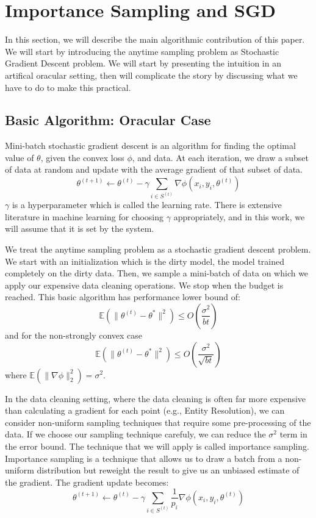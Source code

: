 \section{Importance Sampling and SGD}
In this section, we will describe the main algorithmic contribution of this paper.
We will start by introducing the anytime sampling problem as Stochastic Gradient Descent problem.
We will start by presenting the intuition in an artifical oracular setting, then will complicate the
story by discussing what we have to do to make this practical.

\subsection{Basic Algorithm: Oracular Case}
Mini-batch stochastic gradient descent is an algorithm for finding the optimal value
of $\theta$, given the convex loss $\phi$, and data.
At each iteration, we draw a subset of data at random and update with the average gradient of that subset of data.
 \[
 \theta^{(t+1)}\leftarrow\theta^{(t)}-\gamma\sum_{i\in S^{(t)}}\nabla\phi(x_{i},y_{i},\theta^{(t)})
 \]
$\gamma$ is a hyperparameter which is called the learning rate.
There is extensive literature in machine learning for choosing $\gamma$ appropriately, and in this work, we will assume that it is set by the system.

We treat the anytime sampling problem as a stochastic gradient descent problem.
We start with an initialization which is the dirty model, the model trained completely on the dirty data.
Then, we sample a mini-batch of data on which we apply our expensive data cleaning operations.
We stop when the budget is reached.
This basic algorithm has performance lower bound of:
\[
\mathbb{E}(\|\theta^{(t)}-\theta^{*}\|^{2})\le O(\frac{\sigma^{2}}{bt})
\]
and for the non-strongly convex case 
\[
\mathbb{E}(\|\theta^{(t)}-\theta^{*}\|^{2})\le O(\frac{\sigma^{2}}{\sqrt{bt}})
\]
where $\mathbb{E}(\|\nabla\phi\|_{2}^{2})=\sigma^{2}$.

In the data cleaning setting, where the data cleaning is often far more expensive than calculating a gradient for each point (e.g., Entity Resolution), we can consider non-uniform sampling techniques that require some pre-processing of the data.
If we choose our sampling technique carefuly, we can reduce the $\sigma^{2}$ term in the error bound.
The technique that we will apply is called importance sampling.
Importance sampling is a technique that allows us to draw a batch from a non-uniform distribution but reweight the result to give us an unbiased estimate of the gradient.
The gradient update becomes:
\[\theta^{(t+1)}\leftarrow\theta^{(t)}-\gamma\sum_{i\in S^{(t)}}\frac{1}{p_{i}}\nabla\phi(x_{i},y_{i},\theta^{(t)})\]

